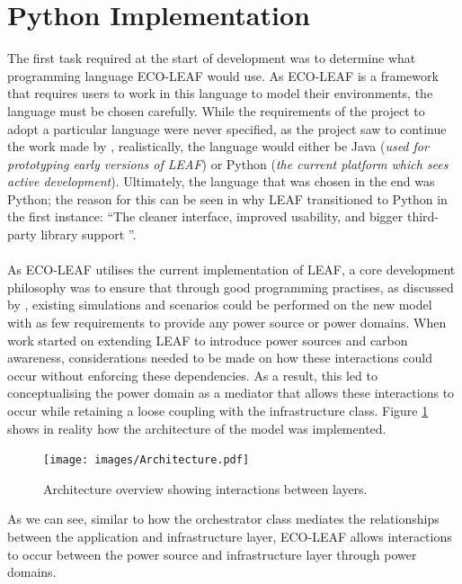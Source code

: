 \documentclass{l4proj}
\begin{document}
\section{Python Implementation}\label{sec:python}
The first task required at the start of development was to determine what programming language ECO-LEAF would use.
As ECO-LEAF is a framework that requires users to work in this language to model their environments, the language must be chosen carefully.
While the requirements of the project to adopt a particular language were never specified, as the project saw to continue the work made by \cite{leaf2021}, realistically, the language would either be Java (\textit{used for prototyping early versions of LEAF}) or Python (\textit{the current platform which sees active development}).
Ultimately, the language that was chosen in the end was Python; the reason for this can be seen in why LEAF transitioned to Python in the first instance: ``The cleaner interface, improved usability, and bigger third-party library support \citep{leaf-java-git}''.\\ \\
As ECO-LEAF utilises the current implementation of LEAF, a core development philosophy was to ensure that through good programming practises, as discussed by \citep{looseCoupling}, existing simulations and scenarios could be performed on the new model with as few requirements to provide any power source or power domains.
When work started on extending LEAF to introduce power sources and carbon awareness, considerations needed to be made on how these interactions could occur without enforcing these dependencies.
As a result, this led to conceptualising the power domain as a mediator that allows these interactions to occur while retaining a loose coupling with the infrastructure class.
Figure \ref{fig:archtecture} shows in reality how the architecture of the model was implemented.

\begin{figure}[h]
    \centering
    \texttt{[image: images/Architecture.pdf]}
    ~
    \caption{Architecture overview showing interactions between layers.}
    \label{fig:archtecture}
\end{figure}

As we can see, similar to how the orchestrator class mediates the relationships between the application and infrastructure layer, ECO-LEAF allows interactions to occur between the power source and infrastructure layer through power domains.
\end{document}
